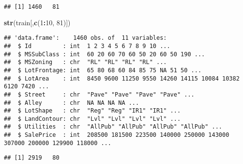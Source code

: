 \documentclass[]{article}
\newenvironment{Shaded}{\begin{snugshade}}{\end{snugshade}}
\newcommand{\KeywordTok}[1]{\textcolor[rgb]{0.13,0.29,0.53}{\textbf{#1}}}
\newcommand{\DecValTok}[1]{\textcolor[rgb]{0.00,0.00,0.81}{#1}}
\newcommand{\StringTok}[1]{\textcolor[rgb]{0.31,0.60,0.02}{#1}}
\newcommand{\CommentTok}[1]{\textcolor[rgb]{0.56,0.35,0.01}{\textit{#1}}}
\newcommand{\OtherTok}[1]{\textcolor[rgb]{0.56,0.35,0.01}{#1}}
\newcommand{\OperatorTok}[1]{\textcolor[rgb]{0.81,0.36,0.00}{\textbf{#1}}}
\newcommand{\NormalTok}[1]{#1}
\begin{document}
\begin{verbatim}
## [1] 1460   81
\end{verbatim}

\begin{Shaded}
\begin{Highlighting}[]
\KeywordTok{str}\NormalTok{(train[,}\KeywordTok{c}\NormalTok{(}\DecValTok{1}\OperatorTok{:}\DecValTok{10}\NormalTok{, }\DecValTok{81}\NormalTok{)])}
\end{Highlighting}
\end{Shaded}

\begin{verbatim}
## 'data.frame':    1460 obs. of  11 variables:
##  $ Id         : int  1 2 3 4 5 6 7 8 9 10 ...
##  $ MSSubClass : int  60 20 60 70 60 50 20 60 50 190 ...
##  $ MSZoning   : chr  "RL" "RL" "RL" "RL" ...
##  $ LotFrontage: int  65 80 68 60 84 85 75 NA 51 50 ...
##  $ LotArea    : int  8450 9600 11250 9550 14260 14115 10084 10382 6120 7420 ...
##  $ Street     : chr  "Pave" "Pave" "Pave" "Pave" ...
##  $ Alley      : chr  NA NA NA NA ...
##  $ LotShape   : chr  "Reg" "Reg" "IR1" "IR1" ...
##  $ LandContour: chr  "Lvl" "Lvl" "Lvl" "Lvl" ...
##  $ Utilities  : chr  "AllPub" "AllPub" "AllPub" "AllPub" ...
##  $ SalePrice  : int  208500 181500 223500 140000 250000 143000 307000 200000 129900 118000 ...
\end{verbatim}

\begin{Shaded}
\end{Shaded}

\begin{Shaded}
\end{Shaded}

\begin{verbatim}
## [1] 2919   80
\end{verbatim}
\end{document}
